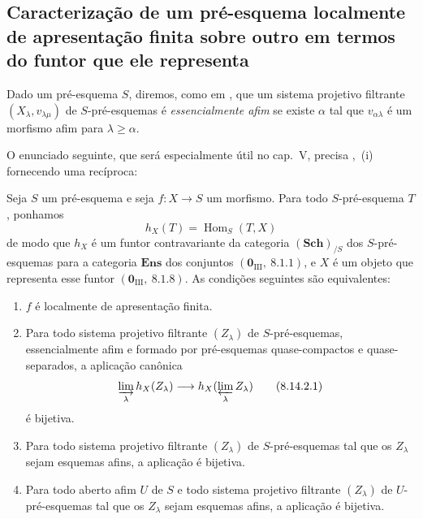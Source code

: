 \subsection{Caracterização de um pré-esquema localmente de apresentação finita sobre outro em termos do funtor que ele representa}
\label{subsection:IV.8.14}

\begin{env}[8.14.1]
\label{IV.8.14.1}
Dado um pré-esquema $S$, diremos, como em , que um sistema projetivo filtrante $(X_\lambda,v_{\lambda\mu})$ de $S$-pré-esquemas é \emph{essencialmente afim} se existe $\alpha$ tal que $v_{\alpha\lambda}$ é um morfismo afim para $\lambda\geqslant\alpha$.

O enunciado seguinte, que será especialmente útil no cap.~V, precisa ,~(i) fornecendo uma recíproca:
\end{env}

\begin{proposition}[8.14.2]
\label{IV.8.14.2}
Seja $S$ um pré-esquema e seja $f:X\to S$ um morfismo.
Para todo $S$-pré-esquema $T$, ponhamos
\[
h_X(T)=\operatorname{Hom}_S(T,X)
\]
de modo que $h_X$ é um funtor contravariante da categoria $(\mathbf{Sch})_{/S}$ dos $S$-pré-esquemas para a categoria $\mathbf{Ens}$ dos conjuntos $(\mathbf{0}_{\text{III}},~8.1.1)$, e $X$ é um objeto que representa esse funtor $(\mathbf{0}_{\text{III}},~8.1.8)$.
As condições seguintes são equivalentes:
\begin{enumerate}[label=\emph{\alph*)}]
  \item $f$ é localmente de apresentação finita.
  \item Para todo sistema projetivo filtrante $(Z_\lambda)$ de $S$-pré-esquemas, essencialmente afim  e formado por pré-esquemas quase-compactos e quase-separados, a aplicação canônica 
\begin{equation}
\label{IV.8.14.2.1}
\varinjlim_\lambda h_X(Z_\lambda)\to h_X(\varprojlim_\lambda Z_\lambda) \tag{8.14.2.1}
\end{equation}
é bijetiva.
  \item Para todo sistema projetivo filtrante $(Z_\lambda)$ de $S$-pré-esquemas tal que os $Z_\lambda$ sejam esquemas afins, a aplicação  é bijetiva.
  \item[\rm c$'$)] Para todo aberto afim $U$ de $S$ e todo sistema projetivo filtrante $(Z_\lambda)$ de $U$-pré-esquemas tal que os $Z_\lambda$ sejam esquemas afins, a aplicação  é bijetiva.
\end{enumerate}
\end{proposition}


